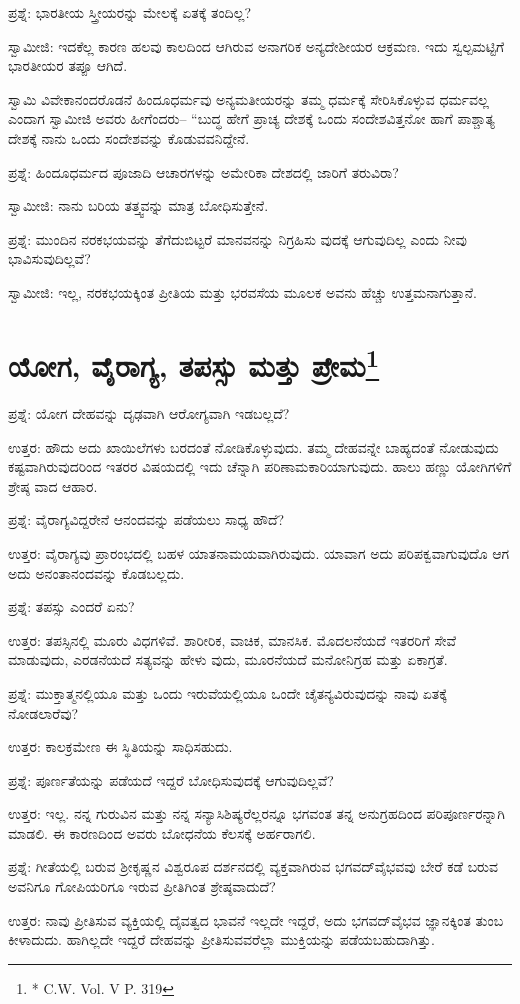 ಪ್ರಶ್ನೆ: ಭಾರತೀಯ ಸ್ತ್ರೀಯರನ್ನು ಮೇಲಕ್ಕೆ ಏತಕ್ಕೆ ತಂದಿಲ್ಲ?

ಸ್ವಾಮೀಜಿ: ಇದಕೆಲ್ಲ ಕಾರಣ ಹಲವು ಕಾಲದಿಂದ ಆಗಿರುವ ಅನಾಗರಿಕ ಅನ್ಯದೇಶೀಯರ ಆಕ್ರಮಣ. ಇದು ಸ್ವಲ್ಪಮಟ್ಟಿಗೆ ಭಾರತೀಯರ ತಪ್ಪೂ ಆಗಿದೆ.

ಸ್ವಾಮಿ ವಿವೇಕಾನಂದರೊಡನೆ ಹಿಂದೂಧರ್ಮವು ಅನ್ಯಮತೀಯರನ್ನು ತಮ್ಮ ಧರ್ಮಕ್ಕೆ ಸೇರಿಸಿಕೊಳ್ಳುವ ಧರ್ಮವಲ್ಲ ಎಂದಾಗ ಸ್ವಾಮೀಜಿ ಅವರು ಹೀಗೆಂದರು– “ಬುದ್ಧ ಹೇಗೆ ಪ್ರಾಚ್ಯ ದೇಶಕ್ಕೆ ಒಂದು ಸಂದೇಶವಿತ್ತನೋ ಹಾಗೆ ಪಾಶ್ಚಾತ್ಯ ದೇಶಕ್ಕೆ ನಾನು ಒಂದು ಸಂದೇಶವನ್ನು ಕೊಡುವವನಿದ್ದೇನೆ.

ಪ್ರಶ್ನೆ: ಹಿಂದೂಧರ್ಮದ ಪೂಜಾದಿ ಆಚಾರಗಳನ್ನು ಅಮೇರಿಕಾ ದೇಶದಲ್ಲಿ ಜಾರಿಗೆ ತರುವಿರಾ?

ಸ್ವಾಮೀಜಿ: ನಾನು ಬರಿಯ ತತ್ತ್ವವನ್ನು ಮಾತ್ರ ಬೋಧಿಸುತ್ತೇನೆ.

ಪ್ರಶ್ನೆ: ಮುಂದಿನ ನರಕಭಯವನ್ನು ತೆಗೆದುಬಿಟ್ಟರೆ ಮಾನವನನ್ನು ನಿಗ್ರಹಿಸು ವುದಕ್ಕೆ ಆಗುವುದಿಲ್ಲ ಎಂದು ನೀವು ಭಾವಿಸುವುದಿಲ್ಲವೆ?

ಸ್ವಾಮೀಜಿ: ಇಲ್ಲ, ನರಕಭಯಕ್ಕಿಂತ ಪ್ರೀತಿಯ ಮತ್ತು ಭರವಸೆಯ ಮೂಲಕ ಅವನು ಹೆಚ್ಚು ಉತ್ತಮನಾಗುತ್ತಾನೆ.


\section[ಯೋಗ, ವೈರಾಗ್ಯ, ತಪಸ್ಸು ಮತ್ತು ಪ್ರೇಮ]{ಯೋಗ, ವೈರಾಗ್ಯ, ತಪಸ್ಸು ಮತ್ತು ಪ್ರೇಮ\protect\footnote{* C.W. Vol. V P. 319}}

ಪ್ರಶ್ನೆ: ಯೋಗ ದೇಹವನ್ನು ದೃಢವಾಗಿ ಆರೋಗ್ಯವಾಗಿ ಇಡಬಲ್ಲದೆ?

ಉತ್ತರ: ಹೌದು ಅದು ಖಾಯಿಲೆಗಳು ಬರದಂತೆ ನೋಡಿಕೊಳ್ಳುವುದು. ತಮ್ಮ ದೇಹವನ್ನೇ ಬಾಹ್ಯದಂತೆ ನೋಡುವುದು ಕಷ್ಟವಾಗಿರುವುದರಿಂದ ಇತರರ ವಿಷಯದಲ್ಲಿ ಇದು ಚೆನ್ನಾಗಿ ಪರಿಣಾಮಕಾರಿಯಾಗುವುದು. ಹಾಲು ಹಣ್ಣು ಯೋಗಿಗಳಿಗೆ ಶ್ರೇಷ್ಠ ವಾದ ಆಹಾರ.

ಪ್ರಶ್ನೆ: ವೈರಾಗ್ಯವಿದ್ದರೇನೆ ಆನಂದವನ್ನು ಪಡೆಯಲು ಸಾಧ್ಯ ಹೌದೆ?

ಉತ್ತರ: ವೈರಾಗ್ಯವು ಪ್ರಾರಂಭದಲ್ಲಿ ಬಹಳ ಯಾತನಾಮಯವಾಗಿರುವುದು. ಯಾವಾಗ ಅದು ಪರಿಪಕ್ವವಾಗುವುದೊ ಆಗ ಅದು ಅನಂತಾನಂದವನ್ನು ಕೊಡಬಲ್ಲದು.

ಪ್ರಶ್ನೆ: ತಪಸ್ಸು ಎಂದರೆ ಏನು?

ಉತ್ತರ: ತಪಸ್ಸಿನಲ್ಲಿ ಮೂರು ವಿಧಗಳಿವೆ. ಶಾರೀರಿಕ, ವಾಚಿಕ, ಮಾನಸಿಕ. ಮೊದಲನೆಯದೆ ಇತರರಿಗೆ ಸೇವೆ ಮಾಡುವುದು, ಎರಡನೆಯದೆ ಸತ್ಯವನ್ನು ಹೇಳು ವುದು, ಮೂರನೆಯದೆ ಮನೋನಿಗ್ರಹ ಮತ್ತು ಏಕಾಗ್ರತೆ.

ಪ್ರಶ್ನೆ: ಮುಕ್ತಾತ್ಮನಲ್ಲಿಯೂ ಮತ್ತು ಒಂದು ಇರುವೆಯಲ್ಲಿಯೂ ಒಂದೇ ಚೈತನ್ಯವಿರುವುದನ್ನು ನಾವು ಏತಕ್ಕೆ ನೋಡಲಾರೆವು?

ಉತ್ತರ: ಕಾಲಕ್ರಮೇಣ ಈ ಸ್ಥಿತಿಯನ್ನು ಸಾಧಿಸಹುದು.

ಪ್ರಶ್ನೆ: ಪೂರ್ಣತೆಯನ್ನು ಪಡೆಯದೆ ಇದ್ದರೆ ಬೋಧಿಸುವುದಕ್ಕೆ ಆಗುವುದಿಲ್ಲವೆ?

ಉತ್ತರ: ಇಲ್ಲ. ನನ್ನ ಗುರುವಿನ ಮತ್ತು ನನ್ನ ಸನ್ಯಾಸಿಶಿಷ್ಯರೆಲ್ಲರನ್ನೂ ಭಗವಂತ ತನ್ನ ಅನುಗ್ರಹದಿಂದ ಪರಿಪೂರ್ಣರನ್ನಾಗಿ ಮಾಡಲಿ. ಈ ಕಾರಣದಿಂದ ಅವರು ಬೋಧನೆಯ ಕೆಲಸಕ್ಕೆ ಅರ್ಹರಾಗಲಿ.

ಪ್ರಶ್ನೆ: ಗೀತೆಯಲ್ಲಿ ಬರುವ ಶ‍್ರೀಕೃಷ್ಣನ ವಿಶ್ವರೂಪ ದರ್ಶನದಲ್ಲಿ ವ್ಯಕ್ತವಾಗಿರುವ ಭಗವದ್​ವೈಭವವು ಬೇರೆ ಕಡೆ ಬರುವ ಅವನಿಗೂ ಗೋಪಿಯರಿಗೂ ಇರುವ ಪ್ರೀತಿಗಿಂತ ಶ್ರೇಷ್ಠವಾದುದೆ?

ಉತ್ತರ: ನಾವು ಪ್ರೀತಿಸುವ ವ್ಯಕ್ತಿಯಲ್ಲಿ ದೈವತ್ವದ ಭಾವನೆ ಇಲ್ಲದೇ ಇದ್ದರೆ, ಅದು ಭಗವದ್​ವೈಭವ ಜ್ಞಾನಕ್ಕಿಂತ ತುಂಬ ಕೀಳಾದುದು. ಹಾಗಿಲ್ಲದೇ ಇದ್ದರೆ ದೇಹವನ್ನು ಪ್ರೀತಿಸುವವರೆಲ್ಲಾ ಮುಕ್ತಿಯನ್ನು ಪಡೆಯಬಹುದಾಗಿತ್ತು.

